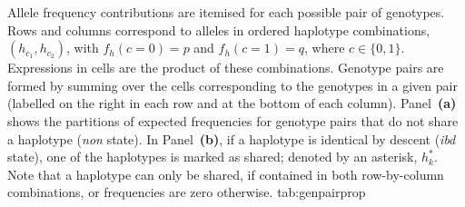 

\begin{table}[!h]
{Allele frequency contributions are itemised for each possible pair of genotypes.
Rows and columns correspond to alleles in ordered haplotype combinations, ${(h_{c_{1}}, h_{c_{2}})}$, with ${f_h(c=0)=p}$ and ${f_h(c=1)=q}$, where ${c \in \lbrace 0,1 \rbrace}$.
Expressions in cells are the product of these combinations.
Genotype pairs are formed by summing over the cells corresponding to the  genotypes in a given pair (labelled on the right in each row and at the bottom of each column).
Panel~\textbf{(a)} shows the partitions of expected frequencies for genotype pairs that do not share a haplotype (\ie \emph{non} state).
In Panel~\textbf{(b)}, if a haplotype is identical by descent (\ie \emph{ibd} state), one of the haplotypes is marked as shared; denoted by an asterisk, $h^*_{k}$.
Note that a haplotype can only be shared, if contained in both row-by-column combinations, or frequencies are zero otherwise.}
{tab:genpairprop}


\end{table}
